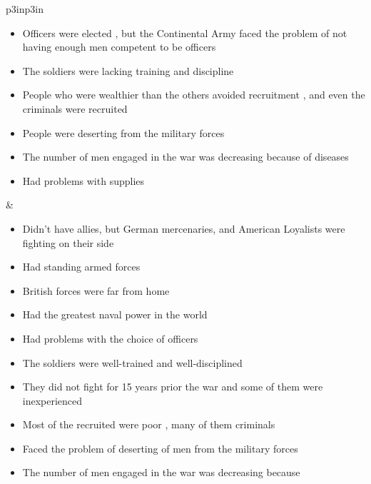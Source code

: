 \begin{singlespace}
\begin{mpxtabular}{p{3in}p{3in}}
\begin{itemize}[nolistsep,leftmargin=*]
	    \item  Officers were elected \cite[p.51]{pancake_1985}, but the Continental Army faced the problem of not having enough men competent to be officers 
	    \item  The soldiers were lacking training and discipline
	      \cite[p.52]{pancake_1985} 
	    \item  People who were wealthier than the others avoided recruitment
	      \cite[p.26]{stephenson_patriot_2007}, and even the criminals were
	      recruited \cite[p.27]{stephenson_patriot_2007} 
	    \item  People were deserting from the military forces
	      \cite[p.48]{pancake_1985} 
	    \item  The number of men engaged in the war was decreasing because
	      of diseases \cite[p. 33]{stephenson_patriot_2007} 
	    \item  Had problems with supplies
	      \cite[p.105]{stephenson_patriot_2007}
	\end{itemize}
	&
	\begin{itemize}[nolistsep,leftmargin=*]
	    \item  Didn’t have allies, but German mercenaries, and American
	      Loyalists were fighting on their side
	      \cite[p.133]{higginbotham_daniel_1961} 
	    \item  Had standing armed forces
	      \cite[p.48]{higginbotham_daniel_1961} 
	    \item  British forces were far from home 
	    \item  Had the greatest naval power in the world
	      \cite[p.43]{stephenson_patriot_2007} 
	    \item  Had problems with the choice of officers
	      \cite[p.543-544]{mackesy1962british} 
	    \item  The soldiers were well-trained and well-disciplined
	      \cite[p.42]{pancake_1985} 
	    \item  They did not fight for 15 years prior the war and some of
	      them were inexperienced \cite[p.44-45]{stephenson_patriot_2007} 
	    \item  Most of the recruited were poor
	      \cite[p.38]{stephenson_patriot_2007}, many of them criminals
	      \cite[p.36]{stephenson_patriot_2007} 
	    \item  Faced the problem of deserting of men from the military
	      forces \cite[p.48]{pancake_1985} 
	    \item  The number of men engaged in the war was decreasing because

\end{itemize}
\end{mpxtabular}
\end{singlespace}

